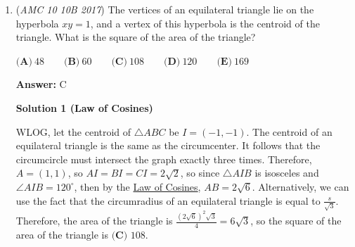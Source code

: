 \begin{enumerate}
\textbf{Solution 3 (Clever way using divisibility rules)}

We know that $45 = 5 \cdot 9$, so we can apply our restrictions to that. We know that the units digit must be $5$ or $0$, and the digits must add up to a multiple of $9$. $1+2+3+4+\cdots + 44 = \frac{44 \cdot 45}{2}$. We can quickly see this is a multiple of $9$ because $\frac{44}{2} \cdot 45 = 22 \cdot 45$. We know $123 \ldots 4344$ is not a multiple of $5$ because the units digit isn't $5$ or $0$. We can just subtract by 9 until we get a number whose units digit is 5 or 0.

 We have $123 \ldots 4344$ is divisible by $9$, so we can subtract by $9$ to get $123 \ldots 4335$ and we know that this is divisible by 5. So our answer is $\boxed{\textbf{(C) } 9}$




\textbf{Solution 4}

Since $N$ ends with the number $4$, $N\equiv 4\pmod 5$. Also, the sum of the digits of $N$ are divisible by $9$, so $N$ must be divisible by $9$. Therefore, we have the system of equations:

 \begin{verbatim}
$N\equiv 4\pmod 5$$N\equiv 0\pmod 9$
\end{verbatim}

According to the second equation, $N\equiv \{0, 9, 18, 27, 36\} \pmod {45}$. The only one of these solutions that is $4\pmod 5$ is $\boxed{\textbf{(C) } 9}$~\href{https://artofproblemsolving.com/wiki/index.php/User:Sid2012}{sid2012}

 


	\item (\textit{AMC 10 10B 2017}) The vertices of an equilateral triangle lie on the hyperbola $xy=1$, and a vertex of this hyperbola is the centroid of the triangle. What is the square of the area of the triangle?


 $\textbf{(A)}\ 48\qquad\textbf{(B)}\ 60\qquad\textbf{(C)}\ 108\qquad\textbf{(D)}\ 120\qquad\textbf{(E)}\ 169$

 \textbf{Answer: }C



\textbf{Solution 1 (Law of Cosines)}

WLOG, let the centroid of $\triangle ABC$ be $I = (-1,-1)$. The centroid of an equilateral triangle is the same as the circumcenter. It follows that the circumcircle must intersect the graph exactly three times. Therefore, $A = (1,1)$, so $AI = BI = CI = 2\sqrt{2}$, so since $\triangle AIB$ is isosceles and $\angle AIB = 120^{\circ}$, then by the \href{https://artofproblemsolving.com/wiki/index.php?title=Law\_of\_Cosines}{Law of Cosines}, $AB = 2\sqrt{6}$. Alternatively, we can use the fact that the circumradius of an equilateral triangle is equal to $\frac {s}{\sqrt{3}}$. Therefore, the area of the triangle is $\frac{(2\sqrt{6})^2\sqrt{3}}4 = 6\sqrt{3}$, so the square of the area of the triangle is $\boxed{\textbf{(C) } 108}$.


\end{enumerate}
